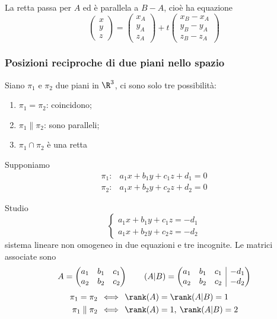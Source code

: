La retta passa per $ A $ ed è parallela a $ B-A $, cioè ha equazione \[
    \begin{pmatrix}
        x \\ y \\ z
    \end{pmatrix}=\begin{pmatrix}
        x_A \\ y_A \\ z_A
    \end{pmatrix} + t \begin{pmatrix}
        x_{B}-x_{A}   \\ y_{B}-y_{A}   \\ z_{B}-z_{A}  
    \end{pmatrix}
\]

\subsubsection{Posizioni reciproche di due piani nello spazio}

Siano $ \pi_1 $ e $ \pi_2 $ due piani in $ \R^{3} $, ci sono solo tre possibilità:
\begin{enumerate}
    \item $ \pi_1= \pi_2 $: coincidono;
    \item $ \pi_1 \parallel \pi_2 $: sono paralleli;
    \item $ \pi_1\cap \pi_2 $ è una retta
\end{enumerate}

Supponiamo \begin{align*}
    \pi_1: &a_1x+b_1y+c_1z+d_1=0\\
    \pi_2: &a_1x+b_2y+c_2z+d_2=0
\end{align*}

Studio \[
    \begin{cases}
        a_1x+b_1y+c_1z=-d_1\\
        a_1x+b_2y+c_2z=-d_2
    \end{cases}
\] sistema lineare non omogeneo in due equazioni e tre incognite. Le matrici associate sono \[
    A=\begin{pmatrix}
        a_1 & b_1 & c_1\\
        a_2 & b_2 & c_2
    \end{pmatrix}\qquad (A|B)=\left(\begin{array}{@{}ccc|c@{}}
        a_1 & b_1 & c_1 & -d_1\\
        a_2 & b_2 & c_2 & -d_2
    \end{array}
    \right) %
\]
\begin{align*}
    \pi_1= \pi_2 \,&\iff\, \rank (A )= \rank(A|B)= 1  \\      
    \pi_1\parallel \pi_2\, &\iff\, \rank(A)=1,\: \rank(A|B)=2
\end{align*}